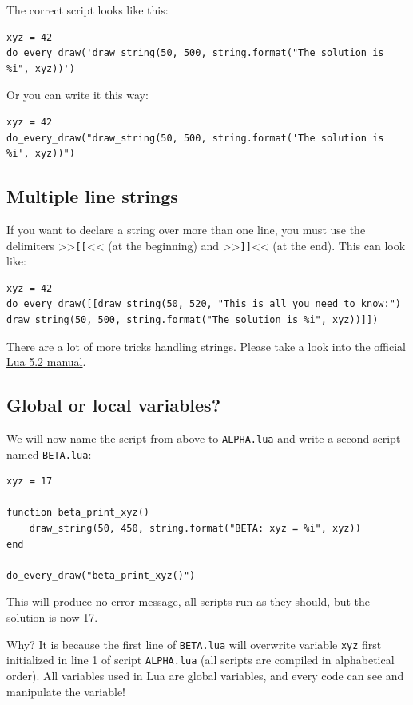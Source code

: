\documentclass[11pt,parskip=half,a4paper]{scrartcl}
\begin{document}
The correct script looks like this:

\begin{lstlisting}
xyz = 42
do_every_draw('draw_string(50, 500, string.format("The solution is %i", xyz))')
\end{lstlisting}

Or you can write it this way:

\begin{lstlisting}
xyz = 42
do_every_draw("draw_string(50, 500, string.format('The solution is %i', xyz))")
\end{lstlisting}

\subsection{Multiple line strings}

If you want to declare a string over more than one line, you must use the delimiters >>\verb|[[|<< (at the beginning) and >>\verb|]]|<< (at the end). This can look like:

\begin{lstlisting}
xyz = 42
do_every_draw([[draw_string(50, 520, "This is all you need to know:")
draw_string(50, 500, string.format("The solution is %i", xyz))]])
\end{lstlisting}

There are a lot of more tricks handling strings. Please take a look into the \href{http://www.lua.org/manual/5.2/manual.html#3.1}{official Lua 5.2 manual}.

\subsection{Global or local variables?}

We will now name the script from above to \verb|ALPHA.lua| and write a second script named \verb|BETA.lua|:

\begin{lstlisting}
xyz = 17

function beta_print_xyz()
    draw_string(50, 450, string.format("BETA: xyz = %i", xyz))
end

do_every_draw("beta_print_xyz()")
\end{lstlisting}

This will produce no error message, all scripts run as they should, but the solution is now 17.

Why? It is because the first line of \verb|BETA.lua| will overwrite variable \verb|xyz| first initialized in line 1 of script \verb|ALPHA.lua| (all scripts are compiled in alphabetical order). All variables used in Lua are global variables, and every code can see and manipulate the variable!
\end{document}
